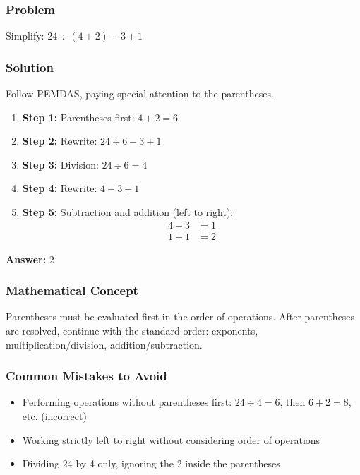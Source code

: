 \documentclass[12pt]{article}
\begin{document}
\subsubsection*{Problem}
Simplify: $24 \div (4 + 2) - 3 + 1$

\subsubsection*{Solution}

Follow PEMDAS, paying special attention to the parentheses.

\begin{enumerate}
\item \textbf{Step 1:} Parentheses first: $4 + 2 = 6$
\item \textbf{Step 2:} Rewrite: $24 \div 6 - 3 + 1$
\item \textbf{Step 3:} Division: $24 \div 6 = 4$
\item \textbf{Step 4:} Rewrite: $4 - 3 + 1$
\item \textbf{Step 5:} Subtraction and addition (left to right):
  \begin{align*}
  4 - 3 &= 1 \\
  1 + 1 &= 2
  \end{align*}
\end{enumerate}

\textbf{Answer: } $2$

\subsubsection*{Mathematical Concept}
Parentheses must be evaluated first in the order of operations. After parentheses are resolved, continue with the standard order: exponents, multiplication/division, addition/subtraction.

\subsubsection*{Common Mistakes to Avoid}
\begin{itemize}
\item Performing operations without parentheses first: $24 \div 4 = 6$, then $6 + 2 = 8$, etc. (incorrect)
\item Working strictly left to right without considering order of operations
\item Dividing 24 by 4 only, ignoring the 2 inside the parentheses
\end{itemize}
\end{document}
